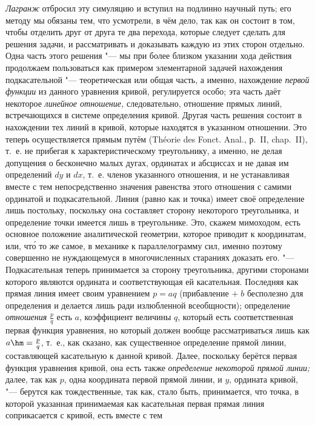 {\em Лагранж} отбросил эту симуляцию и вступил на подлинно научный путь; его
методу мы обязаны тем, что усмотрели, в чём дело, так как он состоит в том,
чтобы отделить друг от друга те два перехода, которые следует сделать для
решения задачи, и рассматривать и доказывать каждую из этих сторон отдельно.
Одна часть этого решения "--- мы при более близком указании хода действия
продолжаем пользоваться как примером элементарной задачей нахождения
подкасательной "--- теоретическая или общая часть, а именно, нахождение
{\em первой функции} из данного уравнения кривой, регулируется особо; эта часть
даёт некоторое {\em линейное отношение,} следовательно, отношение прямых линий,
встречающихся в системе определения кривой. Другая часть решения состоит в
нахождении тех линий в кривой, которые находятся в указанном отношении. Это
теперь осуществляется прямым путём (Théorie des Fonct. Anal., р.~II, chap.~II),
т.~е. не прибегая к характеристическому треугольнику, а именно, не делая
допущения о бесконечно малых дугах, ординатах и абсциссах и не давая им
определений $dy$ и $dx$, т.~е. членов указанного отношения, и не устанавливая
вместе с тем непосредственно значения равенства этого отношения с самими
ординатой и подкасательной. Линия (равно как и точка) имеет своё определение
лишь постольку, поскольку она составляет сторону некоторого треугольника, и
определение точки имеется лишь в треугольнике. Это, скажем мимоходом, есть
основное положение аналитической геометрии, которое приводит к координатам,
или, чт\'{о} то же самое, в механике к параллелограмму сил, именно поэтому
совершенно не нуждающемуся в многочисленных стараниях доказать его. "---
Подкасательная теперь принимается за сторону треугольника, другими сторонами
которого являются ордината и соответствующая ей касательная. Последняя как
прямая линия имеет своим уравнением $p=aq$ (прибавление $+\;b$ бесполезно для
определения и делается лишь ради излюбленной всеобщности); определение
{\em отношения} $\frac p q$ есть $a$, коэффициент величины $q$, который есть
соответственная первая функция уравнения, но который должен вообще
рассматриваться лишь как $a\hm=\frac p q$, т.~е., как сказано, как существенное
определение прямой линии, составляющей касательную к данной кривой. Далее,
поскольку берётся первая функция уравнения кривой, она есть также
{\em определение некоторой прямой линии;} далее, так как $p$, одна координата
первой прямой линии, и $y$, ордината кривой, "--- берутся как тождественные,
так как, стало быть, принимается, что точка, в которой указанная принимаемая
как касательная первая прямая линия соприкасается с кривой, есть вместе с тем
